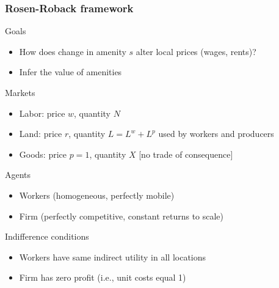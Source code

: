 \documentclass[11pt,notes=hide,aspectratio=169]{beamer}
\begin{document}
\begin{frame}
\frametitle{Rosen-Roback framework}
Goals
\begin{itemize}
\item How does change in amenity $s$ alter local prices (wages, rents)?
\item Infer the value of amenities
\end{itemize}
Markets
\begin{itemize}
\item Labor: price $w$, quantity $N$
\item Land: price $r$, quantity $L=L^w + L^p$ used by workers and producers
\item Goods: price $p=1$, quantity $X$ [no trade of consequence]
\end{itemize}
Agents
\begin{itemize}
\item Workers (homogeneous, perfectly mobile)
\item Firm (perfectly competitive, constant returns to scale)
\end{itemize}
Indifference conditions
\begin{itemize}
\item Workers have same indirect utility in all locations
\item Firm has zero profit (i.e., unit costs equal 1)
\end{itemize}
\end{frame}
\end{document}
